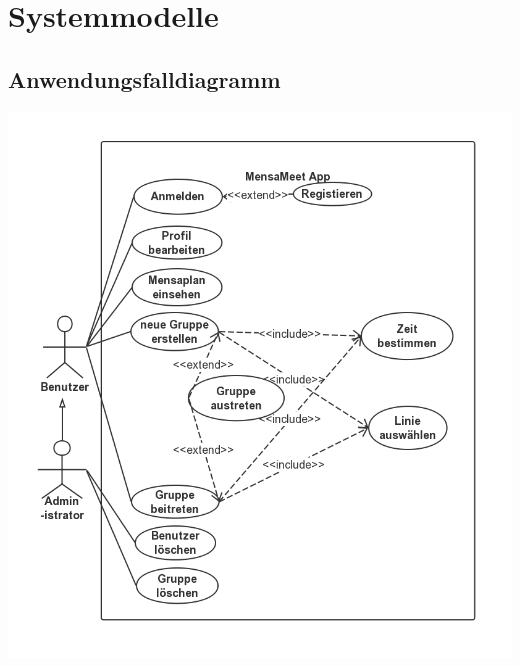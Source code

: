 \documentclass[a4paper]{scrreprt}
\begin{document}
\chapter{Systemmodelle}
\section{Anwendungsfalldiagramm}	
\begin{center}
	\includegraphics[scale=0.5]{res/useCase_MensaMeet.png}
\end{center}
\newpage
\end{document}
